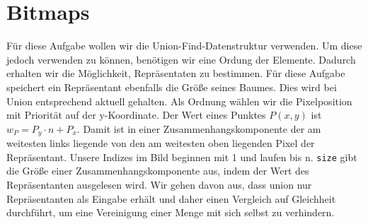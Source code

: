 \documentclass[a4paper,10pt]{article}
\begin{document}
\section{Bitmaps}
Für diese Aufgabe wollen wir die Union-Find-Datenstruktur verwenden. Um diese jedoch verwenden zu können, benötigen wir eine Ordung der Elemente. Dadurch erhalten wir die Möglichkeit, Repräsentaten zu bestimmen. Für diese Aufgabe speichert ein Repräsentant ebenfalls die Größe seines Baumes. Dies wird bei Union entsprechend aktuell gehalten. Als Ordnung wählen wir die Pixelposition mit Priorität auf der y-Koordinate.
Der Wert eines Punktes $P(x,y)$ ist $w_P=P_y \cdot n + P_x$. Damit ist in einer Zusammenhangskomponente der am weitesten links liegende von den am weitesten oben liegenden Pixel der Repräsentant. Unsere Indizes im Bild beginnen mit 1 und laufen bis n. \texttt{size} gibt die Größe einer Zusammenhangskomponente aus, indem der Wert des Repräsentanten ausgelesen wird. Wir gehen davon aus, dass union nur Repräsentanten als Eingabe erhält und daher einen Vergleich auf Gleichheit durchführt, um eine Vereinigung einer Menge mit sich selbst zu verhindern.
\end{document}
